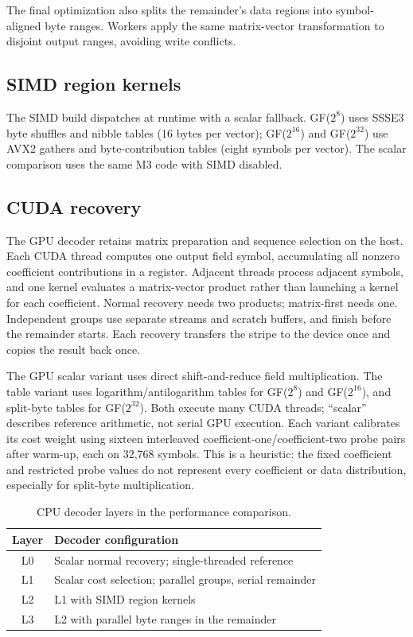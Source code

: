 \documentclass[conference]{IEEEtran}
\begin{document}
The final optimization also splits the remainder's data regions into symbol-aligned byte ranges. Workers apply the same matrix-vector transformation to disjoint output ranges, avoiding write conflicts.

\subsection{SIMD region kernels}
The SIMD build dispatches at runtime with a scalar fallback. GF($2^8$) uses SSSE3 byte shuffles and nibble tables (16 bytes per vector); GF($2^{16}$) and GF($2^{32}$) use AVX2 gathers and byte-contribution tables (eight symbols per vector). The scalar comparison uses the same M3 code with SIMD disabled.

\subsection{CUDA recovery}
The GPU decoder retains matrix preparation and sequence selection on the host. Each CUDA thread computes one output field symbol, accumulating all nonzero coefficient contributions in a register. Adjacent threads process adjacent symbols, and one kernel evaluates a matrix-vector product rather than launching a kernel for each coefficient. Normal recovery needs two products; matrix-first needs one. Independent groups use separate streams and scratch buffers, and finish before the remainder starts. Each recovery transfers the stripe to the device once and copies the result back once.

The GPU scalar variant uses direct shift-and-reduce field multiplication. The table variant uses logarithm/antilogarithm tables for GF($2^8$) and GF($2^{16}$), and split-byte tables for GF($2^{32}$). Both execute many CUDA threads; ``scalar'' describes reference arithmetic, not serial GPU execution. Each variant calibrates its cost weight using sixteen interleaved coefficient-one/coefficient-two probe pairs after warm-up, each on 32,768 symbols. This is a heuristic: the fixed coefficient and restricted probe values do not represent every coefficient or data distribution, especially for split-byte multiplication.

\begin{table}[t]
\caption{CPU decoder layers in the performance comparison.}
\label{tab:layers}
\centering
\footnotesize
\begin{tabular}{c p{}}
\hline
Layer & Decoder configuration \\
\hline
L0 & Scalar normal recovery; single-threaded reference \\
L1 & Scalar cost selection; parallel groups, serial remainder \\
L2 & L1 with SIMD region kernels \\
L3 & L2 with parallel byte ranges in the remainder \\
\hline
\end{tabular}
\end{table}
\end{document}
